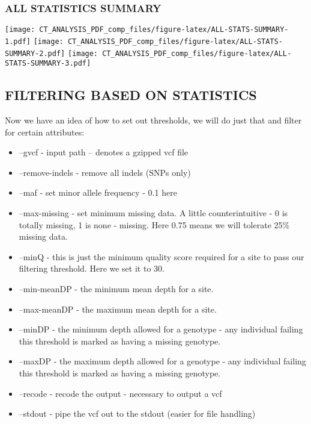 \documentclass[
]{article}
\begin{document}
\hypertarget{all-statistics-summary}{%
\subsubsection{ALL STATISTICS SUMMARY}\label{all-statistics-summary}}

\texttt{[image: CT\_ANALYSIS\_PDF\_comp\_files/figure-latex/ALL-STATS-SUMMARY-1.pdf]}
\texttt{[image: CT\_ANALYSIS\_PDF\_comp\_files/figure-latex/ALL-STATS-SUMMARY-2.pdf]}
\texttt{[image: CT\_ANALYSIS\_PDF\_comp\_files/figure-latex/ALL-STATS-SUMMARY-3.pdf]}

\hypertarget{filtering-based-on-statistics}{%
\subsection{FILTERING BASED ON
STATISTICS}\label{filtering-based-on-statistics}}

Now we have an idea of how to set out thresholds, we will do just that
and filter for certain attributes:

\begin{itemize}
\item
  --gvcf - input path -- denotes a gzipped vcf file
\item
  --remove-indels - remove all indels (SNPs only)
\item
  --maf - set minor allele frequency - 0.1 here
\item
  --max-missing - set minimum missing data. A little counterintuitive -
  0 is totally missing, 1 is none - missing. Here 0.75 means we will
  tolerate 25\% missing data.
\item
  --minQ - this is just the minimum quality score required for a site to
  pass our filtering threshold. Here we set it to 30.
\item
  --min-meanDP - the minimum mean depth for a site.
\item
  --max-meanDP - the maximum mean depth for a site.
\item
  --minDP - the minimum depth allowed for a genotype - any individual
  failing this threshold is marked as having a missing genotype.
\item
  --maxDP - the maximum depth allowed for a genotype - any individual
  failing this threshold is marked as having a missing genotype.
\item
  --recode - recode the output - necessary to output a vcf
\item
  --stdout - pipe the vcf out to the stdout (easier for file handling)
\end{itemize}
\end{document}
